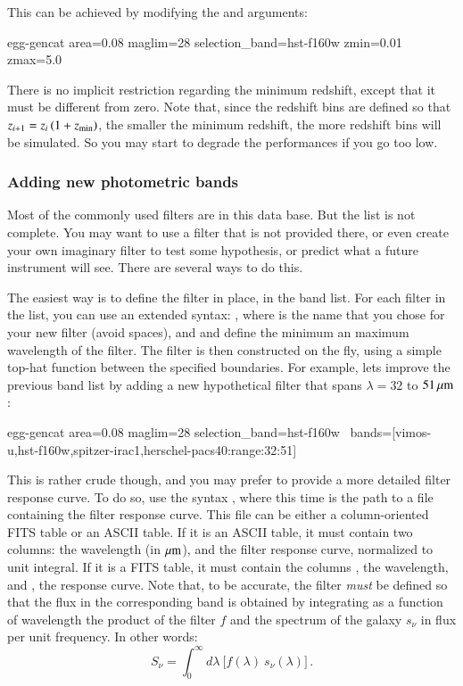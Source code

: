 \documentclass[12pt,a4paper]{article}
\newcommand{\um}{\mu{\rm m}}
\begin{document}
This can be achieved by modifying the  and  arguments:
\begin{bashcode}
egg-gencat area=0.08 maglim=28 selection_band=hst-f160w zmin=0.01 zmax=5.0
\end{bashcode}

There is no implicit restriction regarding the minimum redshift, except that it must be different from zero. Note that, since the redshift bins are defined so that $z_{i+1} = z_{i}\,(1 + z_{\rm min})$, the smaller the minimum redshift, the more redshift bins will be simulated. So you may start to degrade the performances if you go too low.


\subsubsection{Adding new photometric bands}

Most of the commonly used filters are in this data base. But the list is not complete. You may want to use a filter that is not provided there, or even create your own imaginary filter to test some hypothesis, or predict what a future instrument will see. There are several ways to do this.

The easiest way is to define the filter in place, in the band list. For each filter in the  list, you can use an extended syntax: , where  is the name that you chose for your new filter (avoid spaces), and \bashinline{[lmin]} and \bashinline{[lmax]} define the minimum an maximum wavelength of the filter. The filter is then constructed on the fly, using a simple top-hat function between the specified boundaries. For example, lets improve the previous band list by adding a new hypothetical filter  that spans $\lambda = 32$ to $51\,\um$:
\begin{bashcode}
egg-gencat area=0.08 maglim=28 selection_band=hst-f160w \
    bands=[vimos-u,hst-f160w,spitzer-irac1,herschel-pacs40:range:32:51]
\end{bashcode}

This is rather crude though, and you may prefer to provide a more detailed filter response curve. To do so, use the syntax , where this time \bashinline{[path]} is the path to a file containing the filter response curve. This file can be either a column-oriented FITS table or an ASCII table. If it is an ASCII table, it must contain two columns: the wavelength (in $\um$), and the filter response curve, normalized to unit integral. If it is a FITS table, it must contain the columns , the wavelength, and , the response curve. Note that, to be accurate, the filter \emph{must} be defined so that the flux in the corresponding band is obtained by integrating as a function of wavelength the product of the filter $f$ and the spectrum of the galaxy $s_\nu$ in flux per unit frequency. In other words:
\begin{equation}
    S_{\nu} = \int_0^{\infty} \!\!d\lambda\ \big[f(\lambda)\ s_\nu(\lambda)\big]\,. \nonumber
\end{equation}
\end{document}
